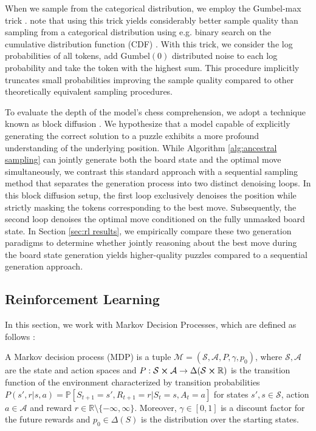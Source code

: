 When we sample from the categorical distribution, we employ the Gumbel-max trick \cite{kool2019stochasticbeamsandwheretofindthem}. \citeauthor{shi2025simplifiedgeneralizedmaskeddiffusion} \cite{shi2025simplifiedgeneralizedmaskeddiffusion} note that using this trick yields considerably better sample quality than sampling from a categorical distribution using e.g. binary search on the cumulative distribution function (CDF) \cite{shi2025simplifiedgeneralizedmaskeddiffusion}. With this trick, we consider the log probabilities of all tokens, add $\mathrm{Gumbel}(0)$ distributed noise to each log probability and take the token with the highest sum. This procedure implicitly truncates small probabilities improving the sample quality compared to other theoretically equivalent sampling procedures.

To evaluate the depth of the model's chess comprehension, we adopt a technique known as block diffusion \cite{arriola2025blockdiffusion}. We hypothesize that a model capable of explicitly generating the correct solution to a puzzle exhibits a more profound understanding of the underlying position. While Algorithm \ref{alg:ancestral sampling} can jointly generate both the board state and the optimal move simultaneously, we contrast this standard approach with a sequential sampling method that separates the generation process into two distinct denoising loops. In this block diffusion setup, the first loop exclusively denoises the position while strictly masking the tokens corresponding to the best move. Subsequently, the second loop denoises the optimal move conditioned on the fully unmasked board state. In Section \ref{sec:rl results}, we empirically compare these two generation paradigms to determine whether jointly reasoning about the best move during the board state generation yields higher-quality puzzles compared to a sequential generation approach.







\subsection{Reinforcement Learning}
\label{sec:reinforcement-learning}

In this section, we work with Markov Decision Processes, which are defined as follows \cite{SuttonAndBarto2018}:

\begin{definition}
    A Markov decision process (MDP) is a tuple $\mathcal{M} = (\mathcal{S}, \mathcal{A}, P, \gamma, p_0)$, where $\mathcal{S}, \mathcal{A}$ are the state and action spaces and $P:\mathcal{S}\cross\mathcal{A}\rightarrow\Delta(\mathcal{S}\cross\mathbb{R})$ is the transition function of the environment characterized by transition probabilities $P(s', r | s, a) = \mathbb{P}[S_{t + 1} = s', R_{t + 1} = r | S_t = s, A_t = a]$ for states $s', s\in\mathcal{S}$,  action $a\in\mathcal{A}$ and reward $r\in\mathbb{R}\setminus\{-\infty, \infty\}$. Moreover, $\gamma\in[0, 1]$ is a discount factor for the future rewards and $p_0\in\Delta(S)$ is the distribution over the starting states.
\end{definition}


